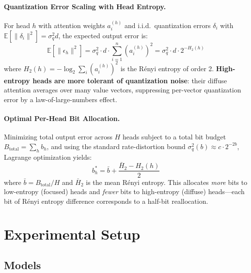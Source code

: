 \documentclass[11pt]{article}
\begin{document}
\paragraph{Quantization Error Scaling with Head Entropy.}
For head $h$ with attention weights $a_i^{(h)}$ and i.i.d.\ quantization errors $\delta_i$ with $\mathbb{E}[\|\delta_i\|^2] = \sigma_q^2 d$, the expected output error is:
\begin{equation}
    \mathbb{E}[\|\epsilon_h\|^2] = \sigma_q^2 \cdot d \cdot \sum_{i=1}^{n} \left(a_i^{(h)}\right)^2 = \sigma_q^2 \cdot d \cdot 2^{-H_2(h)}
    \label{eq:quant_error_entropy}
\end{equation}
where $H_2(h) = -\log_2 \sum_i (a_i^{(h)})^2$ is the R\'{e}nyi entropy of order 2.  \textbf{High-entropy heads are more tolerant of quantization noise}: their diffuse attention averages over many value vectors, suppressing per-vector quantization error by a law-of-large-numbers effect.

\paragraph{Optimal Per-Head Bit Allocation.}
Minimizing total output error across $H$ heads subject to a total bit budget $B_{\text{total}} = \sum_h b_h$, and using the standard rate-distortion bound $\sigma_q^2(b) \approx c \cdot 2^{-2b}$, Lagrange optimization yields:
\begin{equation}
    \boxed{b_h^* = \bar{b} + \frac{\bar{H}_2 - H_2(h)}{2}}
    \label{eq:optimal_bits}
\end{equation}
where $\bar{b} = B_{\text{total}}/H$ and $\bar{H}_2$ is the mean R\'{e}nyi entropy.  This allocates \emph{more} bits to low-entropy (focused) heads and \emph{fewer} bits to high-entropy (diffuse) heads---each bit of R\'{e}nyi entropy difference corresponds to a half-bit reallocation.

\section{Experimental Setup}
\label{sec:setup}

\subsection{Models}
\end{document}
